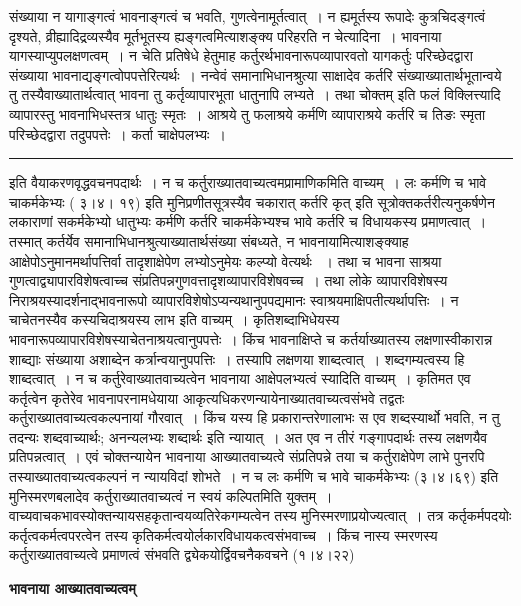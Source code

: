 \documentclass[11pt, openany]{book}
\makeatletter
\def\blfootnote{\gdef\@thefnmark{}\@footnotetext}
\makeatother
\begin{document}
{ संख्याया न यागाङ्गत्वं भावनाङ्गत्वं च भवति, गुणत्वेनामूर्तत्वात्~। न ह्यमूर्तस्य रूपादेः कुत्रचिदङ्गत्वं दृश्यते, व्रीह्यादिद्रव्यस्यैव मूर्तभूतस्य ह्यङ्गत्वमित्याशङ्क्य परिहरति {\br न चेत्यादिना~।} भावनाया यागस्याप्युपलक्षणत्वम्~। न चेति प्रतिषेधे हेतुमाह कर्तुरर्थभावनारूपव्यापारवतो यागकर्तुः परिच्छेदद्वारा संख्याया भावनाद्यङ्गत्वोपपत्तेरित्यर्थः~। {\br नन्वेवं} समानाभिधानश्रुत्या साक्षादेव कर्तरि संख्याख्यातार्थभूतान्वये तु
तस्यैवाख्यातार्थत्वात् भावना तु कर्तृव्यापारभूता धातुनापि लभ्यते~। तथा चोक्तम् इति फलं विक्लित्त्यादि व्यापारस्तु भावनाभिधस्तत्र धातुः स्मृतः~। आश्रये तु फलाश्रये कर्मणि व्यापाराश्रये कर्तरि च तिङः स्मृता}
\newpage
\fancyhead[LO]{भावनाङ्गत्वम् ]}
{\bl\noindent 
परिच्छेदद्वारा तदुपपत्तेः~। कर्ता चाक्षेपलभ्यः~। }\\
\hrule
\vspace{3mm}
\noindent
इति वैयाकरणवृद्धवचनपदार्थः~। न च कर्तुराख्यातवाच्यत्वमप्रामाणिकमिति वाच्यम्~। {\qt लः कर्मणि च भावे चाकर्मकेभ्यः} ( ३।४। १९) इति मुनिप्रणीतसूत्रस्यैव चकारात् {\qt कर्तरि कृत्} इति सूत्रोक्तकर्तरीत्यनुकर्षणेन लकाराणां सकर्मकेभ्यो धातुभ्यः कर्मणि कर्तरि चाकर्मकेभ्यश्च भावे कर्तरि च विधायकस्य प्रमाणत्वात्~। तस्मात् कर्तर्येव
समानाभिधानश्रुत्याख्यातार्थसंख्या संबध्यते, न भावनायामित्याशङ्क्याह आक्षेपोऽनुमानमर्थापत्तिर्वा तादृशाक्षेपेण लभ्योऽनुमेयः कल्प्यो वेत्यर्थः ~। तथा च भावना साश्रया गुणत्वाद्व्यापारविशेषत्वाच्च संप्रतिपन्नगुणवत्तादृशव्यापारविशेषवच्च~। तथा लोके व्यापारविशेषस्य निराश्रयस्यादर्शनाद्भावनारूपो व्यापारविशेषोऽप्यन्यथानुपपद्यमानः स्वाश्रयमाक्षिपतीत्यर्थापत्तिः~। न चाचेतनस्यैव कस्यचिदाश्रयस्य लाभ इति वाच्यम्~। कृतिशब्दाभिधेयस्य भावनारूपव्यापारविशेषस्याचेतनाश्रयत्वानुपपत्तेः~। किंच भावनाक्षिप्ते च कर्तर्याख्यातस्य लक्षणास्वीकारान्न शाब्द्याः संख्याया अशाब्देन कर्त्रान्वयानुपपत्तिः~। तस्यापि लक्षणया शाब्दत्वात्~। शब्दगम्यत्वस्य हि शाब्दत्वात्~। {\br न च} कर्तुरेवाख्यातवाच्यत्वेन भावनाया आक्षेपलभ्यत्वं स्यादिति वाच्यम्~। कृतिमत एव कर्तृत्वेन कृतेरेव भावनापरनामधेयाया आकृत्यधिकरणन्यायेनाख्यातवाच्यत्वसंभवे तद्वतः कर्तुराख्यातवाच्यत्वकल्पनायां गौरवात्~। किंच यस्य हि प्रकारान्तरेणालाभः स एव शब्दस्यार्थो भवति, न तु तदन्यः शब्दवाच्यार्थः; {\qt अनन्यलभ्यः शब्दार्थः} इति न्यायात्~। अत एव न तीरं गङ्गापदार्थः तस्य लक्षणयैव प्रतिपन्नत्वात्~। एवं चोक्तन्यायेन भावनाया आख्यातवाच्यत्वे संप्रतिपन्ने तया च कर्तुराक्षेपेण लाभे पुनरपि तस्याख्यातवाच्यत्वकल्पनं न न्यायविदां शोभते~। {\br न च} {\qt लः कर्मणि च भावे चाकर्मकेभ्यः} (३।४।६९) इति मुनिस्मरणबलादेव कर्तुराख्यातवाच्यत्वं न स्वयं कल्पितमिति युक्तम्~। वाच्यवाचकभावस्योक्तन्यायसहकृतान्वयव्यतिरेकगम्यत्वेन तस्य मुनिस्मरणाप्रयोज्यत्वात्~। तत्र कर्तृकर्मपदयोः कर्तृत्वकर्मत्वपरत्वेन तस्य कृतिकर्मत्वयोर्लकारविधायकत्वसंभवाच्च~। किंच नास्य स्मरणस्य कर्तुराख्यातवाच्यत्वे प्रमाणत्वं संभवति {\qt द्व्येकयोर्द्विवचनैकवचने}
(१।४।२२)
\blfootnote{टिप्प०\textemdash\ $^{१}$वचनार्थ इत्यर्थः~।}
\newpage
\fancyhead[RE]{[ भावनाया आख्यात\textemdash }
\begin{center}
  \textbf{भावनाया आख्यातवाच्यत्वम्}  
\end{center}
  
\end{document}
